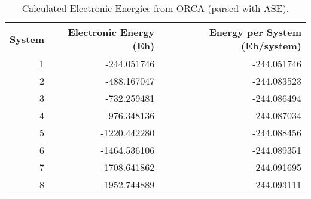 \begin{table}[htbp]
\caption{Calculated Electronic Energies from ORCA (parsed with ASE).}
\label{tab:energies_ase}
\begin{tabular}{rrr}
\toprule
System & Electronic Energy (Eh) & Energy per System (Eh/system) \\
\midrule
1 & -244.051746 & -244.051746 \\
2 & -488.167047 & -244.083523 \\
3 & -732.259481 & -244.086494 \\
4 & -976.348136 & -244.087034 \\
5 & -1220.442280 & -244.088456 \\
6 & -1464.536106 & -244.089351 \\
7 & -1708.641862 & -244.091695 \\
8 & -1952.744889 & -244.093111 \\
\bottomrule
\end{tabular}
\end{table}
